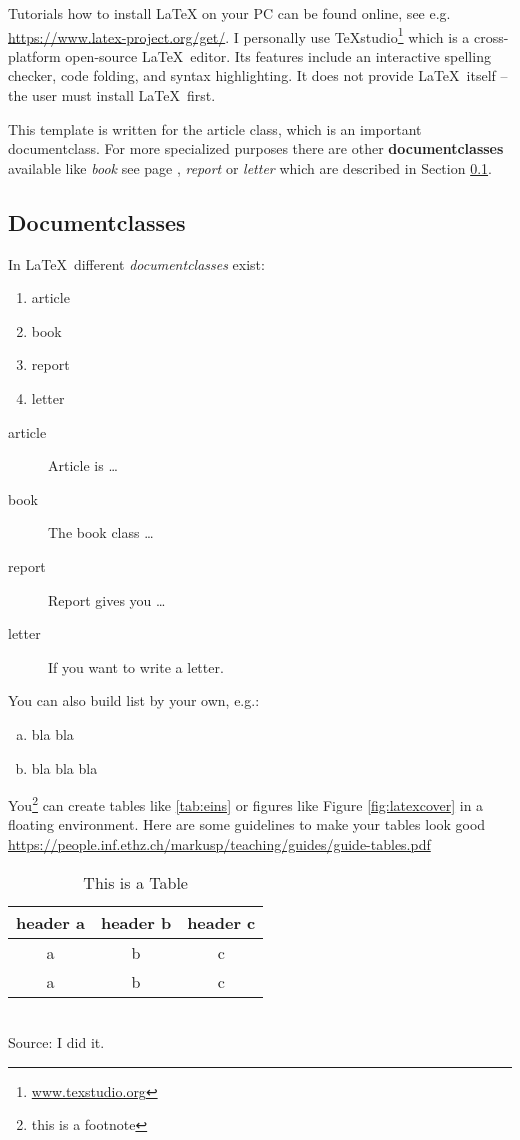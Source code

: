 \documentclass{article}
\begin{document}
Tutorials how to install \LaTeX{} on your PC can be found online, see e.g. \url{https://www.latex-project.org/get/}. I personally use TeXstudio\footnote{\url{www.texstudio.org}}  which is a cross-platform open-source \LaTeX\ editor. Its features include an interactive spelling checker, code folding, and syntax highlighting. It does not provide \LaTeX\ itself -- the user must install \LaTeX\ first.

This template is written for the article class, which is an important documentclass. For more specialized purposes there are other \textbf{documentclasses} available like \textit{book} see page \pageref{book}, \textit{report} or \textit{letter} which are 
	described in Section \ref{documentclasses}. 
	
\subsection{Documentclasses}\label{documentclasses}
In \LaTeX\ different \textit{documentclasses} exist:	
	\begin{enumerate}
		\item article
		\item book 
		\item report 
		\item letter 
	\end{enumerate}
	
	\begin{description}
		\item[article\label{article}]{Article is \ldots}
		\item[book]{The book class \ldots}
		\item[report\label{report}]{Report gives you \ldots}
		\item[letter\label{letter}]{If you want to write a letter.}
	\end{description}

You can also build list by your own, e.g.:
\begin{enumerate}[a)]
	\item bla bla
	\item bla bla bla
\end{enumerate}

You\footnote{this is a footnote} can create tables like \autoref{tab:eins} or figures like Figure \ref{fig:latexcover} in a floating environment. Here are some guidelines to make your tables look good  \url{https://people.inf.ethz.ch/markusp/teaching/guides/guide-tables.pdf}	

\begin{table}
	\begin{center}
		\caption{This is a Table}\label{tab:eins}
		\begin{tabular}{ c c c }\toprule
			header a & header b & header c \\\midrule
			a & b & c \\
			a & b & c \\\bottomrule
		\end{tabular}\\[.5em]
\tiny Source: I did it.
	\end{center}
\end{table}
\end{document}
